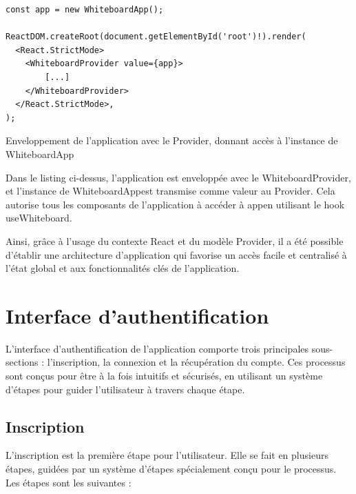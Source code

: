 \begin{listing}[H]
    \begin{verbatim}
const app = new WhiteboardApp();

ReactDOM.createRoot(document.getElementById('root')!).render(
  <React.StrictMode>
    <WhiteboardProvider value={app}>
        [...]
    </WhiteboardProvider>
  </React.StrictMode>,
);
  \end{verbatim}
    \caption{Enveloppement de l'application avec le Provider, donnant accès à l'instance de WhiteboardApp}
\end{listing}

Dans le listing ci-dessus, l'application est enveloppée avec le \guillemotleft WhiteboardProvider\guillemotright, et l'instance de \guillemotleft WhiteboardApp\guillemotright est transmise comme valeur au \guillemotleft Provider\guillemotright. Cela autorise tous les composants de l'application à accéder à \guillemotleft app\guillemotright en utilisant le hook \guillemotleft useWhiteboard\guillemotright.

Ainsi, grâce à l'usage du contexte React et du modèle Provider, il a été possible d'établir une architecture d'application qui favorise un accès facile et centralisé à l'état global et aux fonctionnalités clés de l'application.

\section{Interface d'authentification}

L'interface d'authentification de l'application comporte trois principales sous-sections : l'inscription, la connexion et la récupération du compte. Ces processus sont conçus pour être à la fois intuitifs et sécurisés, en utilisant un système d'étapes pour guider l'utilisateur à travers chaque étape.

\subsection{Inscription}

L'inscription est la première étape pour l'utilisateur. Elle se fait en plusieurs étapes, guidées par un système d'étapes spécialement conçu pour le processus. Les étapes sont les suivantes :

